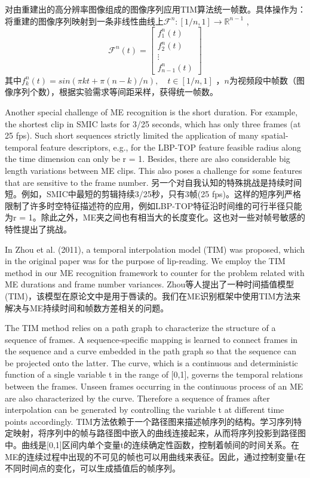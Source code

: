 对由重建出的高分辨率图像组成的图像序列应用TIM算法统一帧数。具体操作为：将重建的图像序列映射到一条非线性曲线上$\mathcal{F}^{n}:\left [ 1/n,1 \right ]\rightarrow \mathbb{R}^{n-1}$ ,
\begin{equation}
    \label{eq4}
    \mathcal{F}^{n}(t)=\begin{bmatrix}f_{1}^{n}(t)\\ f_{2}^{n}(t)\\ \vdots \\ f_{n-1}^{n}(t)\end{bmatrix}
\end{equation}
其中$f_{k}^{n}(t)=sin(\pi kt+\pi (n-k)/n),\quad t\in \left [ 1/n,1 \right ]$ ，$n$为视频段中帧数（图像序列个数），根据实验需求等间距采样，获得统一帧数。

Another special challenge of ME recognition is the short duration. For example, the shortest clip in SMIC lasts for 3/25 seconds, which has only three frames (at 25 fps). Such short sequences strictly limited the application of many spatial-temporal feature descriptors, e.g., for the LBP-TOP feature feasible radius along the time dimension can only be r = 1. Besides, there are also considerable big length variations between ME clips. This also poses a challenge for some features that are sensitive to the frame number.
另一个对自我认知的特殊挑战是持续时间短。例如，SMIC中最短的剪辑持续3/25秒，只有3帧(25 fps)。这样的短序列严格限制了许多时空特征描述符的应用，例如LBP-TOP特征沿时间维的可行半径只能为r = 1。除此之外，ME夹之间也有相当大的长度变化。这也对一些对帧号敏感的特性提出了挑战。

In Zhou et al. (2011), a temporal interpolation model (TIM) was proposed, which in the original paper was for the purpose of lip-reading. We employ the TIM method in our ME recognition framework to counter for the problem related with ME durations and frame number variances.
Zhou等人提出了一种时间插值模型(TIM)，该模型在原论文中是用于唇读的。我们在ME识别框架中使用TIM方法来解决与ME持续时间和帧数方差相关的问题。

The TIM method relies on a path graph to characterize the structure of a sequence of frames. A sequence-specific mapping is learned to connect frames in the sequence and a curve embedded in the path graph so that the sequence can be projected onto the latter. The curve, which is a continuous and deterministic function of a single variable t in the range of [0,1], governs the temporal relations between the frames. Unseen frames occurring in the continuous process of an ME are also characterized by the curve. Therefore a sequence of frames after interpolation can be generated by controlling the variable t at different time points accordingly.
TIM方法依赖于一个路径图来描述帧序列的结构。学习序列特定映射，将序列中的帧与路径图中嵌入的曲线连接起来，从而将序列投影到路径图中。曲线是[0,1]区间内单个变量t的连续确定性函数，控制着帧间的时间关系。在ME的连续过程中出现的不可见的帧也可以用曲线来表征。因此，通过控制变量t在不同时间点的变化，可以生成插值后的帧序列。

